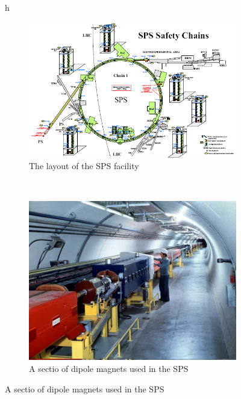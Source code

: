 \begin{figure}{h}
    \centering
    \begin{subfigure}[h]{0.45\textwidth}
        \includegraphics[width=\textwidth]{Figures/LHC_Diagrams/LHC__SPS__layout.png}
        \caption{The layout of the SPS facility}\label{fig:sps_layout}
      \end{subfigure}
      ~ %
    \begin{subfigure}[h]{0.45\textwidth}
        \includegraphics[width=\textwidth]{Figures/LHC_Diagrams/LHC__SPS__beamline.jpg}
        \caption{A sectio of dipole magnets used in the SPS}\label{fig:sps_dipoles}
      \end{subfigure}

\end{figure}
